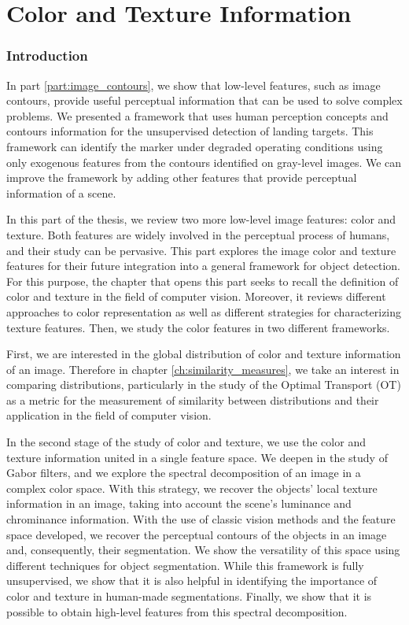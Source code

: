 \part{Color and Texture Information}\label{part:color_texture}%

\section*{Introduction}
In part \ref{part:image_contours}, we show that low-level features, such as image contours, provide useful perceptual information that can be used to solve complex problems. We presented a framework that uses human perception concepts and contours information for the unsupervised detection of landing targets. This framework can identify the marker under degraded operating conditions using only exogenous features from the contours identified on gray-level images. We can improve the framework by adding other features that provide perceptual information of a scene.

In this part of the thesis, we review two more low-level image features: color and texture. Both features are widely involved in the perceptual process of humans, and their study can be pervasive. This part explores the image color and texture features for their future integration into a general framework for object detection. For this purpose, the chapter that opens this part seeks to recall the definition of color and texture in the field of computer vision. Moreover, it reviews different approaches to color representation as well as different strategies for characterizing texture features. Then, we study the color features in two different frameworks.

First, we are interested in the global distribution of color and texture information of an image. Therefore in chapter \ref{ch:similarity_measures}, we take an interest in comparing distributions, particularly in the study of the Optimal Transport (OT) as a metric for the measurement of similarity between distributions and their application in the field of computer vision.

In the second stage of the study of color and texture, we use the color and texture information united in a single feature space. We deepen in the study of Gabor filters, and we explore the spectral decomposition of an image in a complex color space. With this strategy, we recover the objects' local texture information in an image, taking into account the scene's luminance and chrominance information. With the use of classic vision methods and the feature space developed, we recover the perceptual contours of the objects in an image and, consequently, their segmentation. We show the versatility of this space using different techniques for object segmentation. While this framework is fully unsupervised, we show that it is also helpful in identifying the importance of color and texture in human-made segmentations. Finally, we show that it is possible to obtain high-level features from this spectral decomposition.

